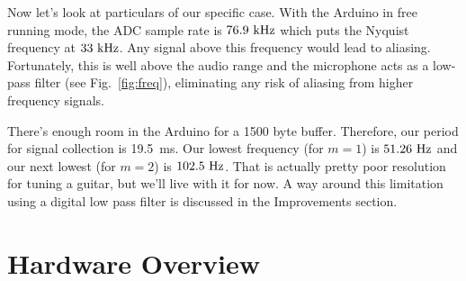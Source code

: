 \documentclass[12pt]{article}
\begin{document}
Now let's look at particulars of our specific case.  With the Arduino in free running mode, the ADC sample rate is $76.9~\rm kHz$ which puts the Nyquist frequency at $33~\rm kHz$.  Any signal above this frequency would lead to aliasing.  Fortunately, this is well above the audio range and the microphone acts as a low-pass filter (see Fig.~\ref{fig:freq}), eliminating any risk of aliasing from higher frequency signals.

There's enough room in the Arduino for a 1500 byte buffer.  Therefore, our period for signal collection is 
{19.5~\rm ms}.  Our lowest frequency (for $m=1$) is $51.26~\rm Hz$ and our next lowest (for $m=2$) is $102.5~\rm Hz$.   That is actually pretty poor resolution for tuning a guitar, but we'll live with it for now.  A way around this limitation using a digital low pass filter is discussed in the Improvements section.

\section{Hardware Overview}
\end{document}
